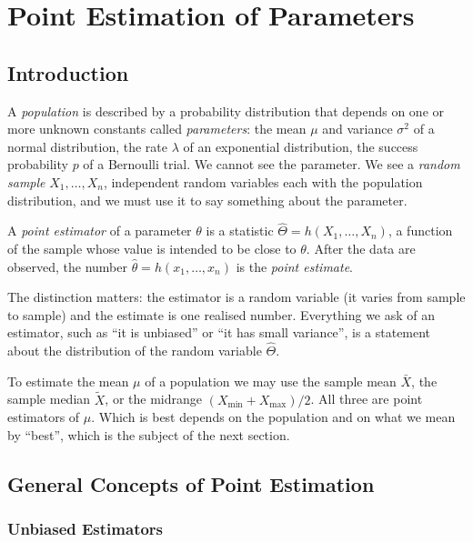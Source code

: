 \chapter{Point Estimation of Parameters}

\section{Introduction}

A \emph{population} is described by a probability distribution that depends on one or more unknown constants called \emph{parameters}: the mean $\mu$ and variance $\sigma^2$ of a normal distribution, the rate $\lambda$ of an exponential distribution, the success probability $p$ of a Bernoulli trial. We cannot see the parameter. We see a \emph{random sample} $X_1,\dots,X_n$, independent random variables each with the population distribution, and we must use it to say something about the parameter.

\begin{definition}
A \emph{point estimator} of a parameter $\theta$ is a statistic $\hat\Theta=h(X_1,\dots,X_n)$, a function of the sample whose value is intended to be close to $\theta$. After the data are observed, the number $\hat\theta=h(x_1,\dots,x_n)$ is the \emph{point estimate}.
\end{definition}

The distinction matters: the estimator is a random variable (it varies from sample to sample) and the estimate is one realised number. Everything we ask of an estimator, such as ``it is unbiased'' or ``it has small variance'', is a statement about the distribution of the random variable $\hat\Theta$.

\begin{example}
To estimate the mean $\mu$ of a population we may use the sample mean $\bar{X}$, the sample median $\tilde{X}$, or the midrange $(X_{\min}+X_{\max})/2$. All three are point estimators of $\mu$. Which is best depends on the population and on what we mean by ``best'', which is the subject of the next section.
\end{example}

\section{General Concepts of Point Estimation}

\subsection{Unbiased Estimators}


